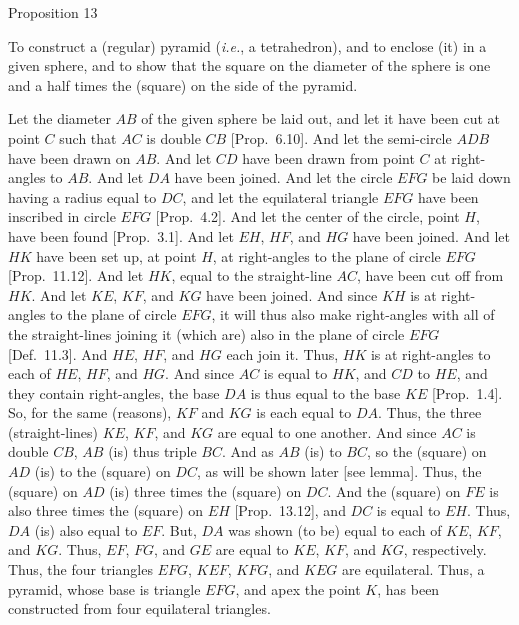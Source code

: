 \begin{center}
{\large Proposition 13}
\end{center}

To construct a (regular) pyramid ({\em i.e.}, a tetrahedron), and to
enclose (it) in a given sphere, and to show that the square on the
diameter of the sphere is one and a half times the (square) on the side 
of the pyramid. 

\epsfysize=3.5in
\centerline{}

Let the diameter $AB$ of the given sphere be laid out, and let it have been
cut at point $C$ such that $AC$ is double $CB$ [Prop.~6.10]. And let the semi-circle 
$ADB$  have been drawn on $AB$. And let $CD$ have been drawn from point
$C$ at right-angles to $AB$. And let $DA$ have been joined. 
And let the circle $EFG$ be laid down having a radius equal to $DC$,
and let the equilateral triangle $EFG$ have been inscribed in circle
$EFG$ [Prop.~4.2]. And let the center of the circle, point $H$,
have been found [Prop.~3.1]. And let $EH$, $HF$, and $HG$ have been
joined. And let $HK$ have been set up, at point $H$, at right-angles to the
plane of circle $EFG$ [Prop.~11.12]. And let $HK$, equal to the straight-line $AC$, have been cut off from $HK$. And let $KE$, $KF$, and $KG$ have been joined.
And since $KH$ is at right-angles to the plane of circle $EFG$, it will
thus also make right-angles with all of the straight-lines joining it
(which are) also in the plane of circle $EFG$ [Def.~11.3]. And $HE$, $HF$,
and $HG$ each join it. Thus, $HK$ is at right-angles to each of $HE$,
$HF$, and $HG$. And since  $AC$ is equal to $HK$, and $CD$ to
$HE$, and they contain right-angles, the base $DA$ is thus equal to the base 
$KE$ [Prop.~1.4]. So, for the same (reasons),  $KF$ and
$KG$ is each equal to $DA$. Thus, the three (straight-lines)
$KE$, $KF$, and $KG$ are equal to one another. And since 
$AC$ is double $CB$, $AB$ (is) thus triple $BC$. And as 
$AB$ (is) to $BC$, so the (square) on $AD$ (is) to the (square)
on $DC$, as will be shown later [see lemma]. Thus, the (square)
on $AD$ (is) three times the (square) on $DC$. And the (square)
on $FE$ is also three times the (square) on $EH$ [Prop.~13.12], 
and $DC$ is equal to $EH$. Thus, $DA$ (is) also equal to $EF$.
But, $DA$ was shown (to be) equal to each of $KE$, $KF$, and
$KG$. Thus, $EF$, $FG$, and $GE$ are equal to 
$KE$, $KF$, and $KG$, respectively. Thus, the four triangles $EFG$, $KEF$,
$KFG$, and $KEG$ are equilateral. Thus, a pyramid, whose base is triangle
$EFG$, and apex the point $K$,   has been
constructed from four equilateral triangles.

